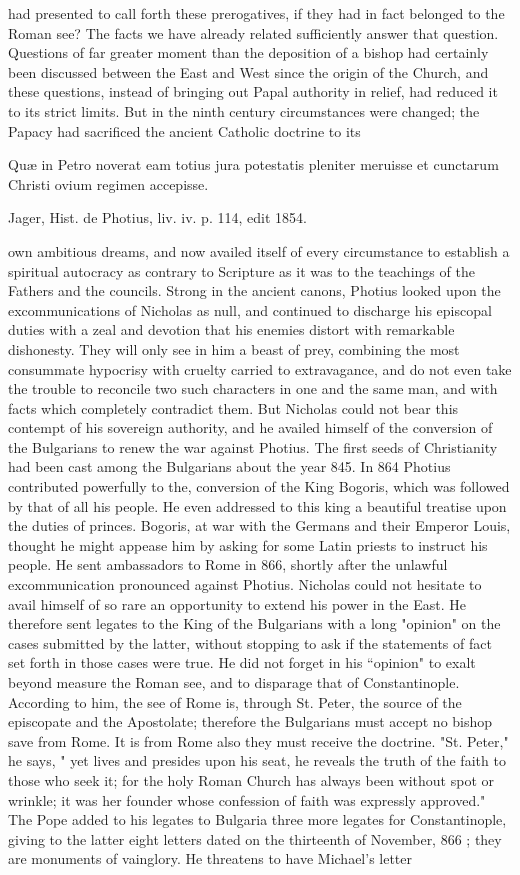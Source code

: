 had presented to call forth these prerogatives, if they had in fact belonged to the Roman see? The facts we have already related sufficiently answer that question. Questions of far greater moment than the deposition of a bishop had certainly been discussed between the East and West since the origin of the Church, and these questions, instead of bringing out Papal authority in relief, had reduced it to its strict limits. But in the ninth century circumstances were changed; the Papacy had sacrificed the ancient Catholic doctrine to its

Quæ in Petro noverat eam totius jura potestatis pleniter meruisse et cunctarum Christi ovium regimen accepisse.

Jager, Hist. de Photius, liv. iv. p. 114, edit 1854.

own ambitious dreams, and now availed itself of every circumstance to establish a spiritual autocracy as contrary to Scripture as it was to the teachings of the Fathers and the councils. Strong in the ancient canons, Photius looked upon the excommunications of Nicholas as null, and continued to discharge his episcopal duties with a zeal and devotion that his enemies distort with remarkable dishonesty. They will only see in him a beast of prey, combining the most consummate hypocrisy with cruelty carried to extravagance, and do not even take the trouble to reconcile two such characters in one and the same man, and with facts which completely contradict them. But Nicholas could not bear this contempt of his sovereign authority, and he availed himself of the conversion of the Bulgarians to renew the war against Photius. The first seeds of Christianity had been cast among the Bulgarians about the year 845. In 864 Photius contributed powerfully to the, conversion of the King Bogoris, which was followed by that of all his people. He even addressed to this king a beautiful treatise upon the duties of princes. Bogoris, at war with the Germans and their Emperor Louis, thought he might appease him by asking for some Latin priests to instruct his people. He sent ambassadors to Rome in 866, shortly after the unlawful excommunication pronounced against Photius. Nicholas could not hesitate to avail himself of so rare an opportunity to extend his power in the East. He therefore sent legates to the King of the Bulgarians with a long "opinion" on the cases submitted by the latter, without stopping to ask if the statements of fact set forth in those cases were true. He did not forget in his “opinion" to exalt beyond measure the Roman see, and to disparage that of Constantinople. According to him, the see of Rome is, through St. Peter, the source of the episcopate and the Apostolate; therefore the Bulgarians must accept no bishop save from Rome. It is from Rome also they must receive the doctrine. "St. Peter," he says, " yet lives and presides upon his seat, he reveals the truth of the faith to those who seek it; for the holy Roman Church has always been without spot or wrinkle; it was her founder whose confession of faith was expressly approved." The Pope added to his legates to Bulgaria three more legates for Constantinople, giving to the latter eight letters dated on the thirteenth of November, 866 ; they are monuments of vainglory. He threatens to have Michael's letter 
